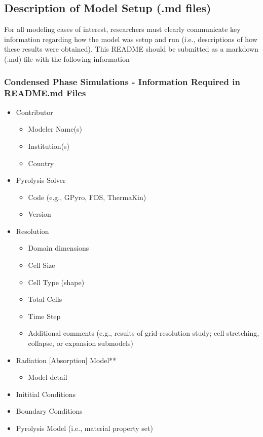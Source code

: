 \documentclass[12pt]{article}
\begin{document}
\subsection{Description of Model Setup (.md files)}
For all modeling cases of interest, researchers must clearly communicate key information regarding how the model was setup and run (i.e., descriptions of how these results were obtained). This README should be submitted as a markdown (.md) file with the following information
\newpage
\subsubsection{Condensed Phase Simulations - Information Required in README.md Files}
\begin{itemize}[noitemsep]
 \item Contributor
 	\begin{itemize}[noitemsep]
	\item Modeler Name(s)
	\item Institution(s)
	\item Country
 	\end{itemize}
 \item Pyrolysis Solver
 	\begin{itemize}[noitemsep]
 	\item Code (e.g., GPyro, FDS, ThermaKin)
	\item Version
 	\end{itemize} 	
 \item Resolution
 	\begin{itemize}[noitemsep]
	\item Domain dimensions
 	\item Cell Size
	\item Cell Type (shape)
 	\item Total Cells
 	\item Time Step
 	\item Additional comments (e.g., results of grid-resolution study; cell stretching, collapse, or expansion submodels)
 	\end{itemize}
\item Radiation [Absorption] Model**
 		\begin{itemize}[noitemsep]
	 	\item Model detail
 	 	\end{itemize}
\item Inititial Conditions
\item Boundary Conditions
\item Pyrolysis Model (i.e., material property set) 

\end{itemize}
\end{document}
